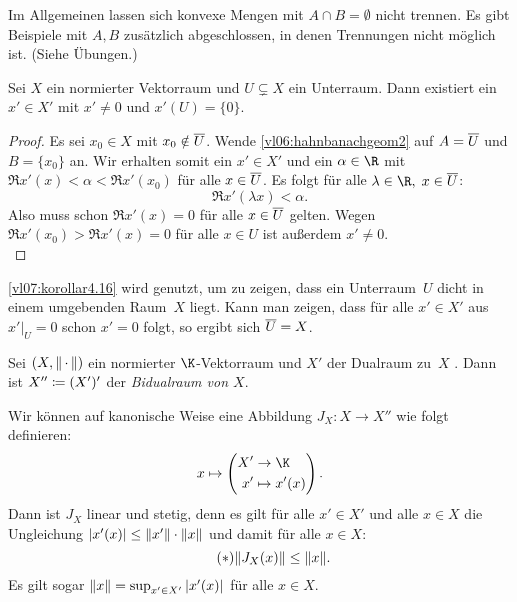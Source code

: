 Im Allgemeinen lassen sich konvexe Mengen mit $A\cap B = \emptyset$ nicht
trennen. Es gibt Beispiele mit $A,B$ zusätzlich abgeschlossen, in denen
Trennungen nicht möglich ist. (Siehe Übungen.)

\begin{thKorollar} \label{vl07:korollar4.16}
    Sei $X$ ein normierter Vektorraum und $U\subsetneq X$ ein Unterraum.
    Dann existiert ein $x'\in X'$ mit $x'\neq 0$ und $x'(U) = \{0\}$.
\end{thKorollar}

\begin{proof}
    Es sei $x_0\in X$ mit $x_0\notin \overline{U}$. 
    Wende \cref{vl06:hahnbanachgeom2} auf $A=\overline{U}$ und $B=\{x_0\}$ an.
    Wir erhalten somit ein $x'\in X'$ und ein $\alpha\in\R$ mit $\Re x'(x) <
    \alpha < \Re x'(x_0)$ für alle $x\in\overline{U}$. Es folgt für alle
    $\lambda\in\R,\;x\in\setclosure U$:
    \[ \Re x'(\lambda x) < \alpha  . \]
    Also muss schon $\Re x'(x) = 0$ für alle $x\in\overline{U}$ gelten. Wegen
    $\Re x'(x_0) > \Re x'(x) = 0$ für alle $x\in U$ ist außerdem $x'\neq 0$.
    \\
\end{proof}

\nnBemerkung
\cref{vl07:korollar4.16} wird genutzt, um zu zeigen, dass ein Unterraum~$U$
dicht in einem umgebenden Raum~$X$ liegt. Kann man zeigen, dass für alle
$x'\in X'$ aus $x'\vert_U = 0$ schon $x'=0$ folgt, so ergibt sich
$\overline{U} = X$.

\begin{thDef}
    Sei $(X,\lVert\,\cdot\,\rVert)$ ein normierter $\K$-Vektorraum und $X'$ der Dualraum zu~$X$
    .
    Dann ist $X'' \coloneqq (X')'$ der \emph{Bidualraum von $X$}.
\end{thDef}
    
Wir können auf kanonische Weise eine Abbildung 
$J_X\colon X\to X''$ wie folgt definieren:
\[ x\mapsto \left( 
        \begin{aligned}
            X' &\to \K  \\
            x' &\mapsto x'(x)
        \end{aligned}
    \right)
. \]
Dann ist $J_X$ linear und stetig, denn es gilt für alle $x'\in X'$ und
alle $x\in X$ die Ungleichung
$\lvert x'(x)\rvert \leq \lVert x'\rVert\cdot \lVert x\rVert$ und damit für alle $x\in X$:
\[ \tag{$\ast$} \label{vl07:ast}
    \lVert J_X(x) \rVert \leq \lVert x\rVert  . \]
Es gilt sogar $\lVert x\rVert = \sup_{x'\in X'} \,\lvert x'(x)\rvert$ für alle $x\in X$.

